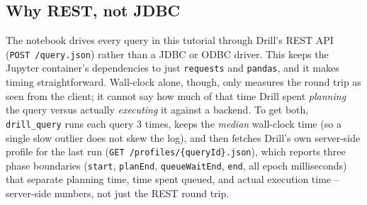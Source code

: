 \documentclass[11pt,a4paper]{article}
\begin{document}
\subsection{Why REST, not JDBC}
The notebook drives every query in this tutorial through Drill's REST API
(\texttt{POST~/query.json}) rather than a JDBC or ODBC driver. This keeps the Jupyter
container's dependencies to just \texttt{requests} and \texttt{pandas}, and it makes
timing straightforward. Wall-clock alone, though, only measures the round trip as
seen from the client; it cannot say how much of that time Drill spent
\emph{planning} the query versus actually \emph{executing} it against a backend. To
get both, \texttt{drill\_query} runs each query 3 times, keeps the \emph{median}
wall-clock time (so a single slow outlier does not skew the log), and then fetches
Drill's own server-side profile for the last run
(\texttt{GET~/profiles/\{queryId\}.json}), which reports three phase boundaries
(\texttt{start}, \texttt{planEnd}, \texttt{queueWaitEnd}, \texttt{end}, all epoch
milliseconds) that separate planning time, time spent queued, and actual execution
time -- server-side numbers, not just the REST round trip.
\end{document}
